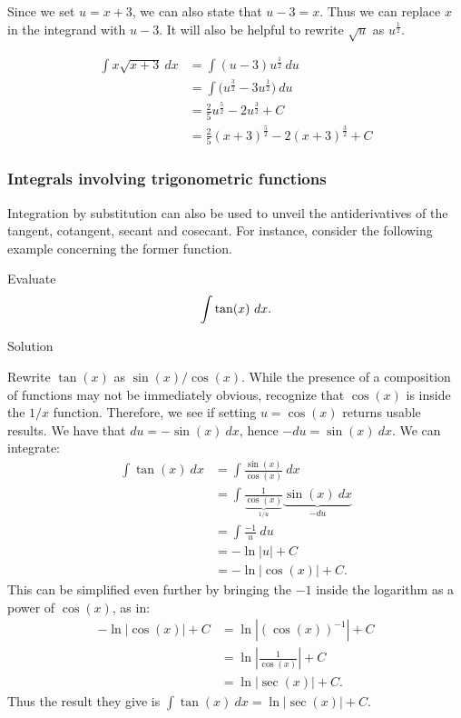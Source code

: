\begin{example}
\begin{enumerate}
Since we set $u = x+3$, we can also state that $u-3 = x$. Thus we can replace $x$ in the integrand with $u-3$. It will also be helpful to rewrite $\sqrt{u}$ as $u^\frac12$.
\allowdisplaybreaks

\begin{align*}
		\int x\sqrt{x+3} \ dx &= \int (u-3)u^\frac12\ du \\[0.2cm]
    &= \int \big(u^\frac32 - 3u^\frac12\big) \ du \\[0.2cm]
											&= \frac25u^\frac52 - 2u^\frac32 + C \\[0.2cm]
											&= \frac25(x+3)^\frac52 - 2(x+3)^\frac32 + C
\end{align*}
\end{enumerate}

\end{example}


\subsubsection{Integrals involving trigonometric functions}


Integration by substitution can also be used to unveil the antiderivatives of the tangent, cotangent, secant and cosecant. For instance, consider the following example concerning the former function. 


\begin{example}\label{ex_sub6}
Evaluate $$\displaystyle \int \tan(x)\ dx.$$

Solution 

Rewrite $\tan(x)$ as $\sin(x)/\cos(x)$. While the presence of a composition of functions may not be immediately obvious, recognize that $\cos(x)$ is inside the $1/x$ function. Therefore, we see if setting $u = \cos(x)$ returns usable results. We have that $du = -\sin(x)\ dx$, hence $-du = \sin(x)\ dx$. We can integrate:
\allowdisplaybreaks
\begin{align*}
		\int \tan (x) \ dx &= \int \frac{\sin(x)}{\cos(x)}\ dx \\[0.2cm]
							&= \int \frac1{\underbrace{\cos(x)}_{1/u}}\underbrace{\sin(x)\ dx}_{-du} \\[0.2cm]
							&= \int \frac {-1}u \ du\\[0.2cm]
							&= -\ln |u| + C \\
							&= -\ln |\cos(x)| + C.
\end{align*}
This can be simplified even further by bringing the $-1$ inside the logarithm as a power of $\cos(x)$, as in:
\begin{align*}
-\ln |\cos(x)| + C &= \ln |(\cos(x))^{-1}| + C\\
			&= \ln \left| \frac{1}{\cos(x)}\right| + C\\
			&= \ln |\sec(x)| + C.
\end{align*}
Thus the result they give is $\int \tan(x) \ dx = \ln|\sec(x)| + C$. 
\end{example}

